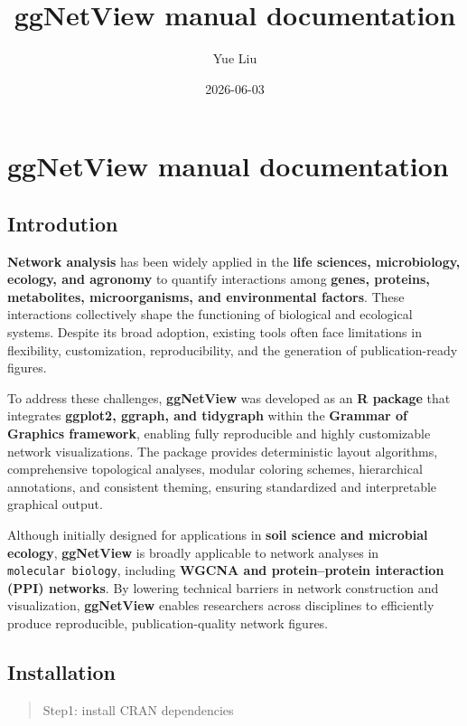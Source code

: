 \documentclass[
]{book}
\title{ggNetView manual documentation}
\author{Yue Liu}
\date{2026-06-03}
\begin{document}
\maketitle

{
\setcounter{tocdepth}{1}
\tableofcontents
}
\chapter{ggNetView manual documentation}\label{ggnetview-manual-documentation}

\section{Introdution}\label{introdution}

\textbf{Network analysis} has been widely applied in the \textbf{life sciences, microbiology, ecology, and agronomy} to quantify interactions among \textbf{genes, proteins, metabolites, microorganisms, and environmental factors}. These interactions collectively shape the functioning of biological and ecological systems. Despite its broad adoption, existing tools often face limitations in flexibility, customization, reproducibility, and the generation of publication-ready figures.

To address these challenges, \textbf{ggNetView} was developed as an \textbf{R package} that integrates \textbf{ggplot2, ggraph, and tidygraph} within the \textbf{Grammar of Graphics framework}, enabling fully reproducible and highly customizable network visualizations. The package provides deterministic layout algorithms, comprehensive topological analyses, modular coloring schemes, hierarchical annotations, and consistent theming, ensuring standardized and interpretable graphical output.

Although initially designed for applications in \textbf{soil science and microbial ecology}, \textbf{ggNetView} is broadly applicable to network analyses in \texttt{molecular\ biology}, including \textbf{WGCNA and protein--protein interaction (PPI) networks}. By lowering technical barriers in network construction and visualization, \textbf{ggNetView} enables researchers across disciplines to efficiently produce reproducible, publication-quality network figures.

\section{Installation}\label{installation}

\begin{quote}
Step1: install CRAN dependencies
\end{quote}
\end{document}
